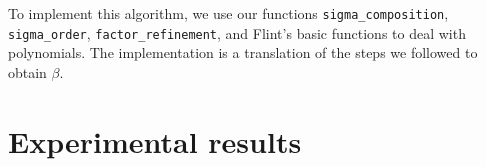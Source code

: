 \documentclass[a4paper,11pt]{article}
\theoremstyle{break}
\theoremstyle{sc}
\theoremstyle{definition}
\theoremstyle{remark}
\begin{document}
To implement this algorithm, we use our functions
\texttt{sigma\_composition},
\texttt{sigma\_order}, \texttt{factor\_refinement}, and Flint's basic functions to deal with
polynomials. The implementation is a translation of the steps we followed
to obtain $\beta$.

\section{Experimental results}

\clearpage


\end{document}
